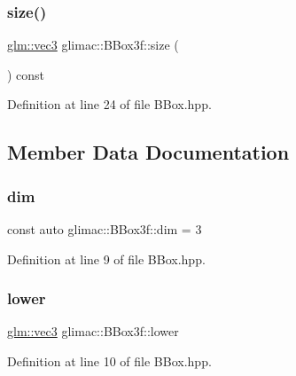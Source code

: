 \subsubsection{\texorpdfstring{size()}{size()}}
{\footnotesize\ttfamily \hyperlink{group__core__types_ga1c47e8b3386109bc992b6c48e91b0be7}{glm\+::vec3} glimac\+::\+B\+Box3f\+::size (\begin{DoxyParamCaption}{ }\end{DoxyParamCaption}) const\hspace{0.3cm}{\ttfamily [inline]}}



Definition at line 24 of file B\+Box.\+hpp.



\subsection{Member Data Documentation}
\mbox{\label{structglimac_1_1_b_box3f_aaf33ad923efc665e09a02895f19a8722}} 
\subsubsection{\texorpdfstring{dim}{dim}}
{\footnotesize\ttfamily const auto glimac\+::\+B\+Box3f\+::dim = 3\hspace{0.3cm}{\ttfamily [static]}}



Definition at line 9 of file B\+Box.\+hpp.

\mbox{\label{structglimac_1_1_b_box3f_a6416c303ada3a2433fb742021e021c27}} 
\subsubsection{\texorpdfstring{lower}{lower}}
{\footnotesize\ttfamily \hyperlink{group__core__types_ga1c47e8b3386109bc992b6c48e91b0be7}{glm\+::vec3} glimac\+::\+B\+Box3f\+::lower}



Definition at line 10 of file B\+Box.\+hpp.

\mbox{\label{structglimac_1_1_b_box3f_a5446e619162abd8011cab858f98d1954}} 
